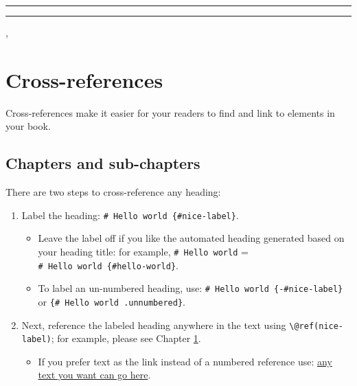 \documentclass[
]{book}
\providecommand{\tightlist}{%
  \setlength{\itemsep}{0pt}\setlength{\parskip}{0pt}}
\theoremstyle{definition}
\theoremstyle{definition}
\theoremstyle{definition}
\theoremstyle{definition}
\theoremstyle{remark}
\begin{document}
\begin{center}\rule{0.5\linewidth}{0.5pt}\end{center}

\begin{center}\rule{0.5\linewidth}{0.5pt}\end{center}

,

\hypertarget{cross}{%
\chapter{Cross-references}\label{cross}}

Cross-references make it easier for your readers to find and link to elements in your book.

\hypertarget{chapters-and-sub-chapters}{%
\section{Chapters and sub-chapters}\label{chapters-and-sub-chapters}}

There are two steps to cross-reference any heading:

\begin{enumerate}
\def\labelenumi{\arabic{enumi}.}
\tightlist
\item
  Label the heading: \texttt{\#\ Hello\ world\ \{\#nice-label\}}.

  \begin{itemize}
  \tightlist
  \item
    Leave the label off if you like the automated heading generated based on your heading title: for example, \texttt{\#\ Hello\ world} = \texttt{\#\ Hello\ world\ \{\#hello-world\}}.
  \item
    To label an un-numbered heading, use: \texttt{\#\ Hello\ world\ \{-\#nice-label\}} or \texttt{\{\#\ Hello\ world\ .unnumbered\}}.
  \end{itemize}
\item
  Next, reference the labeled heading anywhere in the text using \texttt{\textbackslash{}@ref(nice-label)}; for example, please see Chapter \ref{cross}.

  \begin{itemize}
  \tightlist
  \item
    If you prefer text as the link instead of a numbered reference use: \protect\hyperlink{cross}{any text you want can go here}.
  \end{itemize}
\end{enumerate}
\end{document}
